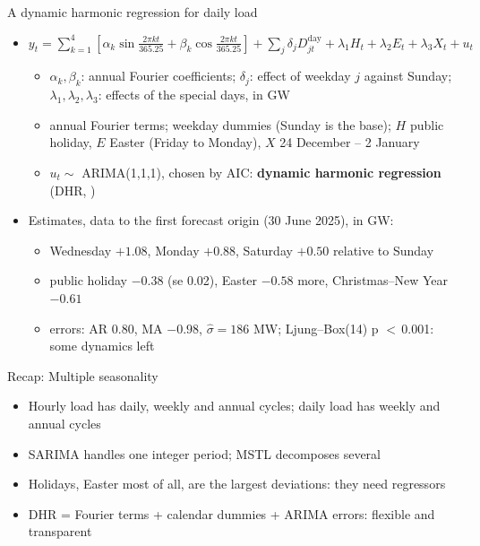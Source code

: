 \begin{frame}{A dynamic harmonic regression for daily load}
\itemsize{\footnotesize}
\begin{itemize}
    \item $y_t = \sum_{k=1}^{4}\left[\alpha_k\sin\frac{2\pi kt}{365.25} + \beta_k\cos\frac{2\pi kt}{365.25}\right] + \sum_{j}\delta_jD^{\mathrm{day}}_{jt} + \lambda_1H_t + \lambda_2E_t + \lambda_3X_t + u_t$
    \begin{itemize}
        \item $\alpha_k, \beta_k$: annual Fourier coefficients; $\delta_j$: effect of weekday $j$ against Sunday; $\lambda_1, \lambda_2, \lambda_3$: effects of the special days, in GW
        \item annual Fourier terms; weekday dummies (Sunday is the base); $H$ public holiday, $E$ Easter (Friday to Monday), $X$ 24 December -- 2 January
        \item $u_t \sim$ ARIMA(1,1,1), chosen by AIC: \textbf{dynamic harmonic regression} (DHR, )
    \end{itemize}
    \item Estimates, data to the first forecast origin (30 June 2025), in GW:
    \begin{itemize}
        \item Wednesday $+1.08$, Monday $+0.88$, Saturday $+0.50$ relative to Sunday
        \item public holiday $-0.38$ (se 0.02), Easter $-0.58$ more, Christmas--New Year $-0.61$
        \item errors: AR $0.80$, MA $\ensuremath{-}0.98$, $\hat\sigma = 186$ MW; Ljung--Box(14) p $<$\,0.001: some dynamics left
    \end{itemize}
\end{itemize}
\end{frame}

\begin{frame}{Recap: Multiple seasonality}
\itemsize{\small}
\begin{itemize}
    \item Hourly load has daily, weekly and annual cycles; daily load has weekly and annual cycles
    \item SARIMA handles one integer period; MSTL decomposes several
    \item Holidays, Easter most of all, are the largest deviations: they need regressors
    \item DHR = Fourier terms + calendar dummies + ARIMA errors: flexible and transparent
\end{itemize}
\end{frame}


